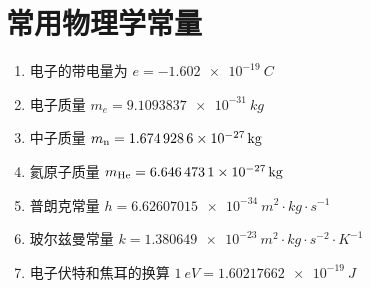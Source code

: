 \appendix\section{常用物理学常量}


\begin{enumerate}
    \item 电子的带电量为 $e=\qty{-1.602e-19}{C}$
    \item 电子质量 $m_{e}=\qty{9.1093837e-31}{kg}$
    \item 中子质量 $m_{\rm n}=\qty{1.6749286 e-27}{kg}$
    \item 氦原子质量 $m_{\rm He}=\qty{6.6464731E-27}{kg}$
    \item 普朗克常量 $h=\qty{6.62607015e-34}{m^2\cdot kg \cdot s^{-1}}$
    \item 玻尔兹曼常量 $k=\qty{1.380649e-23}{m^2\cdot kg\cdot s^{-2}\cdot K^{-1}}$
    \item 电子伏特和焦耳的换算 $\qty{1}{eV}=\qty{1.60217662e-19}{J}$
\end{enumerate}

